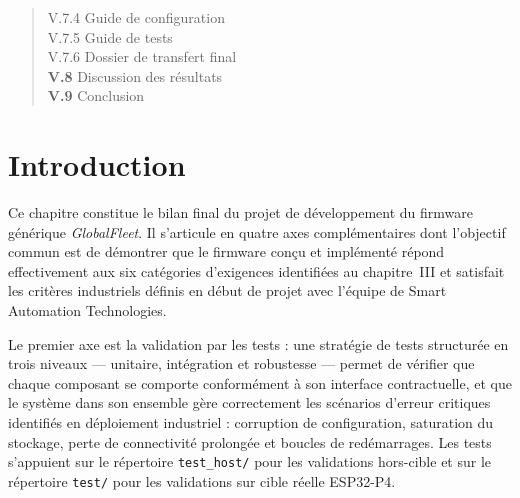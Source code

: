 \begin{quote}
\hspace{2.5em} V.7.4 \hspace{0.5em} Guide de configuration \dotfill \pageref{subsec:doc_cfg}\\
\hspace{2.5em} V.7.5 \hspace{0.5em} Guide de tests \dotfill \pageref{subsec:doc_tests}\\
\hspace{2.5em} V.7.6 \hspace{0.5em} Dossier de transfert final \dotfill \pageref{subsec:doc_transfer}\\
\textbf{V.8} \hspace{1em} Discussion des résultats \dotfill \pageref{sec:discussion}\\
\textbf{V.9} \hspace{1em} Conclusion \dotfill \pageref{sec:conclu_ch5}\\
\end{quote}

\newpage

\section{Introduction}
\label{sec:intro_ch5}

Ce chapitre constitue le bilan final du projet de développement du
firmware générique \textit{GlobalFleet}. Il s'articule en quatre axes
complémentaires dont l'objectif commun est de démontrer que le firmware
conçu et implémenté répond effectivement aux six catégories d'exigences
identifiées au chapitre~III et satisfait les critères industriels
définis en début de projet avec l'équipe de Smart Automation Technologies.

Le premier axe est la validation par les tests : une stratégie de
tests structurée en trois niveaux — unitaire, intégration et
robustesse — permet de vérifier que chaque composant se comporte
conformément à son interface contractuelle, et que le système dans
son ensemble gère correctement les scénarios d'erreur critiques
identifiés en déploiement industriel : corruption de configuration,
saturation du stockage, perte de connectivité prolongée et boucles
de redémarrages. Les tests s'appuient sur le répertoire
\texttt{test\_host/} pour les validations hors-cible et sur le
répertoire \texttt{test/} pour les validations sur cible réelle
ESP32-P4.

